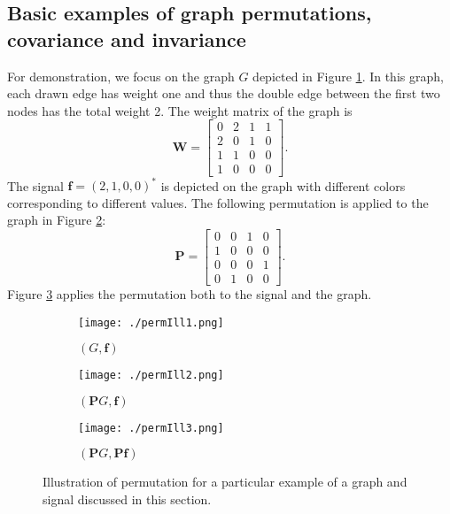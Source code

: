 \documentclass{article}
\def\BP{\boldsymbol{P}}
\def\BW{\boldsymbol{W}}
\def\Bf{\boldsymbol{f}}
\begin{document}
\subsection{Basic examples of graph permutations, covariance and invariance}
\label{subsec:example}
For demonstration, we focus on the graph $G$ depicted in Figure \ref{fig:permIll1}. In this graph, each drawn edge has weight one and thus the double edge between the first two nodes has the total weight 2. The weight matrix of the graph is 
\begin{equation}\label{eq:defWeightMatrix}
\BW = \begin{bmatrix}
    0 & 2 & 1 & 1 \\
    2  & 0 & 1 & 0 \\
   1  & 1 & 0 & 0 \\
   1 & 0 & 0 & 0 
\end{bmatrix}
.
\end{equation}
The signal $\Bf = (2,1,0,0)^*$ is depicted on the graph with different colors corresponding to different values.
The following permutation is applied to the graph in Figure \ref{fig:permIll2}:
\begin{equation}\label{eq:defPermMatrix}
\BP = \begin{bmatrix}
0	&0	&1	&0 \\
1	&0	&0	&0 \\
0	&0	&0	&1 \\
0	&1	&0	&0 
\end{bmatrix}
.
\end{equation}
Figure \ref{fig:permIll3} applies the permutation both to the signal and the graph. 


\begin{figure}[!ht]
\centering
\begin{subfigure}{.32\textwidth}
	\centering
    \texttt{[image: ./permIll1.png]}
    \caption{$(G, \Bf)$}
    \label{fig:permIll1}
\end{subfigure}
\begin{subfigure}{.32\textwidth}
	\centering
    \texttt{[image: ./permIll2.png]}
    \caption{$(\BP G, \Bf)$}
    \label{fig:permIll2}
\end{subfigure}
\begin{subfigure}{.32\textwidth}
	\centering
    \texttt{[image: ./permIll3.png]}
    \caption{$(\BP G, \BP \Bf)$}
    \label{fig:permIll3}
\end{subfigure}
\caption{Illustration of permutation for a particular example of a graph and signal discussed in this section.}
\label{fig:permIll}
\end{figure}
\end{document}
